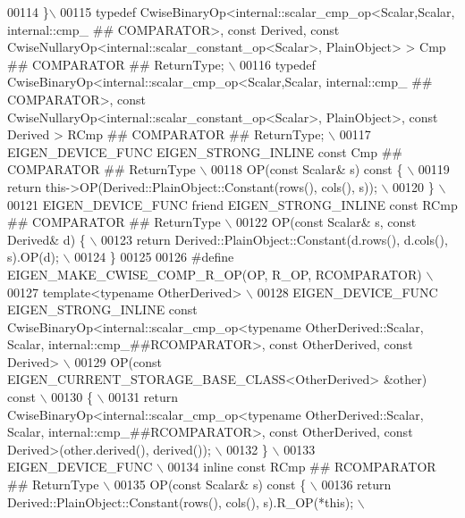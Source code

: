 \begin{DoxyCode}
00114 \textcolor{preprocessor}{\}\(\backslash\)}
00115 \textcolor{preprocessor}{typedef CwiseBinaryOp<internal::scalar\_cmp\_op<Scalar,Scalar, internal::cmp\_ ## COMPARATOR>, const Derived,
       const CwiseNullaryOp<internal::scalar\_constant\_op<Scalar>, PlainObject> > Cmp ## COMPARATOR ## ReturnType; \(\backslash\)}
00116 \textcolor{preprocessor}{typedef CwiseBinaryOp<internal::scalar\_cmp\_op<Scalar,Scalar, internal::cmp\_ ## COMPARATOR>, const
       CwiseNullaryOp<internal::scalar\_constant\_op<Scalar>, PlainObject>, const Derived > RCmp ## COMPARATOR ## ReturnType; 
      \(\backslash\)}
00117 \textcolor{preprocessor}{EIGEN\_DEVICE\_FUNC EIGEN\_STRONG\_INLINE const Cmp ## COMPARATOR ## ReturnType \(\backslash\)}
00118 \textcolor{preprocessor}{OP(const Scalar& s) const \{ \(\backslash\)}
00119 \textcolor{preprocessor}{  return this->OP(Derived::PlainObject::Constant(rows(), cols(), s)); \(\backslash\)}
00120 \textcolor{preprocessor}{\} \(\backslash\)}
00121 \textcolor{preprocessor}{EIGEN\_DEVICE\_FUNC friend EIGEN\_STRONG\_INLINE const RCmp ## COMPARATOR ## ReturnType \(\backslash\)}
00122 \textcolor{preprocessor}{OP(const Scalar& s, const Derived& d) \{ \(\backslash\)}
00123 \textcolor{preprocessor}{  return Derived::PlainObject::Constant(d.rows(), d.cols(), s).OP(d); \(\backslash\)}
00124 \textcolor{preprocessor}{\}}
00125 
00126 \textcolor{preprocessor}{#define EIGEN\_MAKE\_CWISE\_COMP\_R\_OP(OP, R\_OP, RCOMPARATOR) \(\backslash\)}
00127 \textcolor{preprocessor}{template<typename OtherDerived> \(\backslash\)}
00128 \textcolor{preprocessor}{EIGEN\_DEVICE\_FUNC EIGEN\_STRONG\_INLINE const CwiseBinaryOp<internal::scalar\_cmp\_op<typename
       OtherDerived::Scalar, Scalar, internal::cmp\_##RCOMPARATOR>, const OtherDerived, const Derived> \(\backslash\)}
00129 \textcolor{preprocessor}{OP(const EIGEN\_CURRENT\_STORAGE\_BASE\_CLASS<OtherDerived> &other) const \(\backslash\)}
00130 \textcolor{preprocessor}{\{ \(\backslash\)}
00131 \textcolor{preprocessor}{  return CwiseBinaryOp<internal::scalar\_cmp\_op<typename OtherDerived::Scalar, Scalar,
       internal::cmp\_##RCOMPARATOR>, const OtherDerived, const Derived>(other.derived(), derived()); \(\backslash\)}
00132 \textcolor{preprocessor}{\} \(\backslash\)}
00133 \textcolor{preprocessor}{EIGEN\_DEVICE\_FUNC \(\backslash\)}
00134 \textcolor{preprocessor}{inline const RCmp ## RCOMPARATOR ## ReturnType \(\backslash\)}
00135 \textcolor{preprocessor}{OP(const Scalar& s) const \{ \(\backslash\)}
00136 \textcolor{preprocessor}{  return Derived::PlainObject::Constant(rows(), cols(), s).R\_OP(*this); \(\backslash\)}

\end{DoxyCode}
